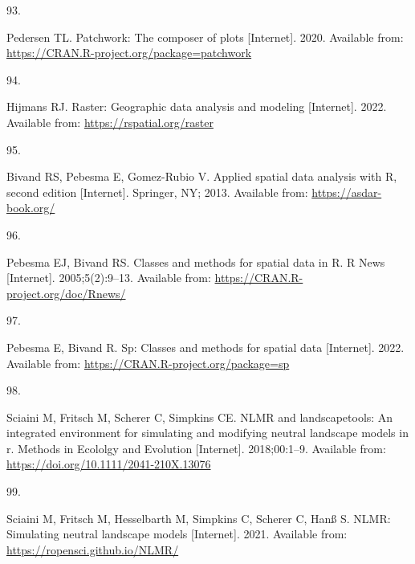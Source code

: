\documentclass[10pt,a4paper]{article}
\newlength{\cslhangindent}
\newlength{\csllabelwidth}
\newlength{\cslentryspacingunit} %
\newenvironment{CSLReferences}[2] %
 {%
  \setlength{\parindent}{0pt}
  \ifodd #1
  \let\oldpar\par
  \def\par{\hangindent=\cslhangindent\oldpar}
  \fi
  \setlength{\parskip}{#2\cslentryspacingunit}
 }%
 {}
\newcommand{\CSLLeftMargin}[1]{\parbox[t]{\csllabelwidth}{#1}}
\newcommand{\CSLRightInline}[1]{\parbox[t]{\linewidth - \csllabelwidth}{#1}\break}
\begin{document}
\begin{CSLReferences}{0}{0}
\leavevmode{}%
\CSLLeftMargin{93. }
\CSLRightInline{Pedersen TL. Patchwork: The composer of plots {[}Internet{]}. 2020. Available from: \url{https://CRAN.R-project.org/package=patchwork}}

\leavevmode{}%
\CSLLeftMargin{94. }
\CSLRightInline{Hijmans RJ. Raster: Geographic data analysis and modeling {[}Internet{]}. 2022. Available from: \url{https://rspatial.org/raster}}

\leavevmode{}%
\CSLLeftMargin{95. }
\CSLRightInline{Bivand RS, Pebesma E, Gomez-Rubio V. Applied spatial data analysis with {R}, second edition {[}Internet{]}. Springer, NY; 2013. Available from: \url{https://asdar-book.org/}}

\leavevmode{}%
\CSLLeftMargin{96. }
\CSLRightInline{Pebesma EJ, Bivand RS. Classes and methods for spatial data in {R}. R News {[}Internet{]}. 2005;5(2):9--13. Available from: \url{https://CRAN.R-project.org/doc/Rnews/}}

\leavevmode{}%
\CSLLeftMargin{97. }
\CSLRightInline{Pebesma E, Bivand R. Sp: Classes and methods for spatial data {[}Internet{]}. 2022. Available from: \url{https://CRAN.R-project.org/package=sp}}

\leavevmode{}%
\CSLLeftMargin{98. }
\CSLRightInline{Sciaini M, Fritsch M, Scherer C, Simpkins CE. NLMR and landscapetools: An integrated environment for simulating and modifying neutral landscape models in r. Methods in Ecololgy and Evolution {[}Internet{]}. 2018;00:1--9. Available from: \url{https://doi.org/10.1111/2041-210X.13076}}

\leavevmode{}%
\CSLLeftMargin{99. }
\CSLRightInline{Sciaini M, Fritsch M, Hesselbarth M, Simpkins C, Scherer C, Hanß S. NLMR: Simulating neutral landscape models {[}Internet{]}. 2021. Available from: \url{https://ropensci.github.io/NLMR/}}

\end{CSLReferences}
\end{document}
